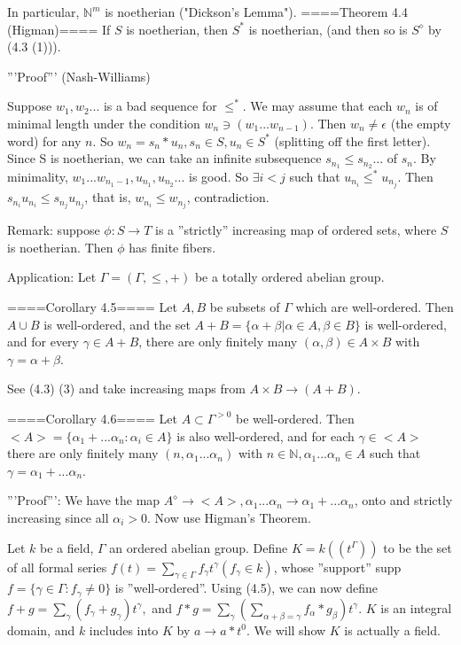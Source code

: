 In particular, $\mathbb{N}^m$ is noetherian ("Dickson's Lemma").
====Theorem 4.4 (Higman)====
If $S$ is noetherian, then $S^*$ is noetherian, (and then so is $S^\diamond$ by (4.3 (1))).

'''Proof''' (Nash-Williams)

Suppose $w_1, w_2...$ is a bad sequence for $\leq^*$. We may assume that each $w_n$ is of minimal length under the condition $w_n \ni (w_1...w_{n-1})$. Then $w_n \neq \epsilon$ (the empty word) for any $n$. So $w_n=s_{n}*u_{n}, s_n \in S, u_n  \in S^*$ (splitting off the first letter). Since S is noetherian, we can take an infinite subsequence $s_{n_1} \leq s_{n_2}...$ of $s_n$. By minimality, $w_1...w_{n_{1}-1}, u_{n_1}, u_{n_2}...$ is good. So $\exists i<j$ such that $u_{n_i} \leq^* u_{n_j}$. Then $s_{n_i}u_{n_i} \leq s_{n_j}u_{n_j}$, that is, $w_{n_i} \leq w_{n_j}$, contradiction.

Remark: suppose $\phi: S \rightarrow T$ is a ''strictly'' increasing map of ordered sets, where $S$ is noetherian. Then $\phi$ has finite fibers.

Application: Let $\Gamma=(\Gamma, \leq, +)$ be a totally ordered abelian group.

====Corollary 4.5====
Let $A, B$ be subsets of $\Gamma$ which are well-ordered. Then $A \cup B$ is well-ordered, and the set $A+B=\{\alpha + \beta | \alpha \in A, \beta \in B\}$ is well-ordered, and for every $\gamma \in A+B$, there are only finitely many $(\alpha, \beta) \in A \times B$ with $\gamma = \alpha + \beta$.

See (4.3) (3) and take increasing maps from $A \times B \rightarrow (A+B)$.

====Corollary 4.6====
Let $A \subset \Gamma^{>0}$ be well-ordered. Then $<A>=\{\alpha_1+...\alpha_n: \alpha_i \in A\}$ is also well-ordered, and for each $\gamma \in <A>$ there are only finitely many $(n, \alpha_1...\alpha_n)$ with $n \in \mathbb{N}, \alpha_1...\alpha_n \in A$ such that $\gamma=\alpha_1+...\alpha_n$.

'''Proof''':
We have the map $A^\diamond \rightarrow <A>, \alpha_1...\alpha_n \rightarrow \alpha_1+...\alpha_n$, onto and strictly increasing since all $\alpha_i >0$. Now use Higman's Theorem.


Let $k$ be a field, $\Gamma$ an ordered abelian group. Define $K=k((t^\Gamma))$ to be the set of all formal series $f(t)=\sum_{\gamma \in \Gamma} f_\gamma t^\gamma (f_\gamma \in k)$, whose ''support'' supp$f=\{\gamma \in \Gamma: f_\gamma \neq 0\}$ is ''well-ordered''. Using (4.5), we can now define $f+g=\sum_{\gamma} (f_\gamma + g_\gamma)t^\gamma,$ and $f*g= \sum_{\gamma} (\sum_{\alpha+\beta=\gamma} f_\alpha * g_\beta)t^\gamma$. $K$ is an integral domain, and $k$ includes into $K$ by $a \rightarrow a*t^0$. We will show $K$ is actually a field.
